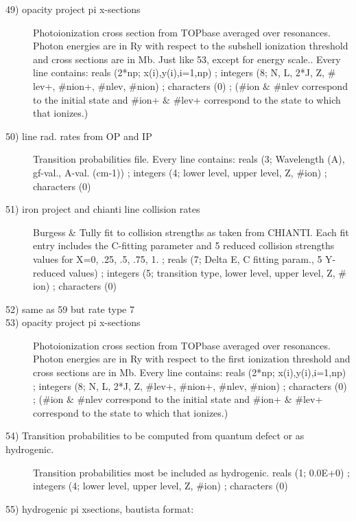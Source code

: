 \begin{description}
\item[49) opacity project  pi x-sections                                  ]
 Photoionization cross section from TOPbase averaged over resonances. 
 Photon energies are in Ry with respect to the subshell ionization threshold 
and cross sections are in Mb.
Just like 53, except for energy scale..
 Every line  contains:
 reals (2*np; x(i),y(i),i=1,np)
; integers (8; N, L, 2*J, Z, $\#$lev+, $\#$nion+, $\#$nlev, $\#$nion)
; characters (0)
; ($\#$ion $\&$ $\#$nlev correspond to the initial state and $\#$ion+ $\&$ $\#$lev+
 correspond to the state to which that ionizes.) 


\item[50) line rad. rates from OP and IP]
 Transition probabilities file.
 Every line  contains:
 reals (3; Wavelength (A), gf-val., A-val. (cm-1))
; integers (4; lower level, upper level, Z, $\#$ion)
; characters (0)

\item[51) iron project and chianti line collision rates    ]
 Burgess $\&$ Tully fit to collision strengths as taken from CHIANTI.
 Each fit entry includes the C-fitting parameter and 5 reduced 
 collision strengths values for X=0, .25, .5, .75, 1.
; reals (7; Delta E, C fitting param., 5 Y-reduced values)
; integers (5; transition type, lower level, upper level, Z, $\#$ion)
; characters (0)

\item[52)  same as 59 but rate type 7   ]


\item[53) opacity project  pi x-sections                                  ]
 Photoionization cross section from TOPbase averaged over resonances. 
 Photon energies are in Ry with respect to the first ionization threshold 
and cross sections are in Mb.
 Every line  contains:
 reals (2*np; x(i),y(i),i=1,np)
; integers (8; N, L, 2*J, Z, $\#$lev+, $\#$nion+, $\#$nlev, $\#$nion)
; characters (0)
; ($\#$ion $\&$ $\#$nlev correspond to the initial state and $\#$ion+ $\&$ $\#$lev+
 correspond to the state to which that ionizes.) 

\item[54) Transition probabilities to be computed from quantum defect or as hydrogenic.  ]
 Transition probabilities most be included as hydrogenic.
 reals (1; 0.0E+0)
; integers (4; lower level, upper level, Z, $\#$ion)
; characters (0)

\item[55)  hydrogenic pi xsections, bautista format: ]


\end{description}
